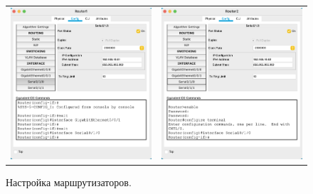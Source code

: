 \documentclass[a4paper,14pt]{extreport} %
\begin{document}
\begin{enumerate}
\begin{figure}[H]\center
	\begin{tabular}{cc}
		\includegraphics[scale=0.47]{6}&
		 \includegraphics[scale=0.47]{7} \\
	\end{tabular}
	\caption{Настройка маршрутизаторов. }
\end{figure}


\end{enumerate}
\end{document}

